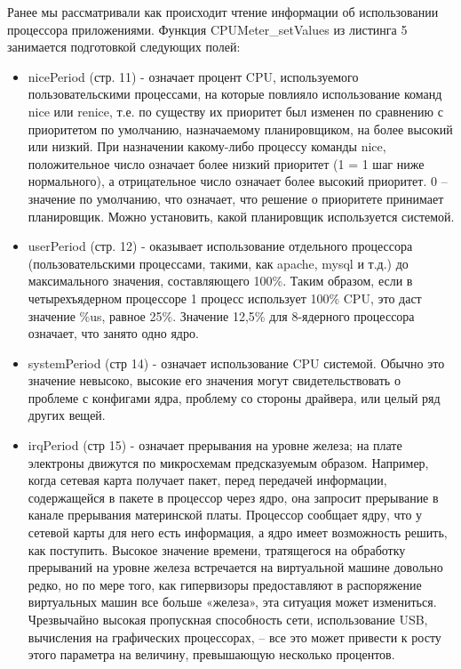 \documentclass[a4paper, 12pt]{article}		%
\begin{document}
Ранее мы рассматривали как происходит чтение информации об использовании процессора приложениями. Функция CPUMeter\_setValues из листинга 5 занимается подготовкой следующих полей:
\begin{itemize}
\item nicePeriod (стр. 11) - означает процент CPU, используемого пользовательскими процессами, на которые повлияло использование команд nice или renice, т.е. по существу их приоритет был изменен по сравнению с приоритетом по умолчанию, назначаемому планировщиком, на более высокий или низкий. При назначении какому-либо процессу команды nice, положительное число означает более низкий приоритет (1 = 1 шаг ниже нормального), а отрицательное число означает более высокий приоритет. 0 -- значение по умолчанию, что означает, что решение о приоритете принимает планировщик. Можно установить, какой планировщик используется системой.
\item userPeriod (стр. 12) - оказывает использование отдельного процессора (пользовательскими процессами, такими, как apache, mysql и т.д.) до максимального значения, составляющего 100\%. Таким образом, если в четырехъядерном процессоре 1 процесс использует 100\% CPU, это даст значение \%us, равное 25\%. Значение 12,5\% для 8-ядерного процессора означает, что занято одно ядро.
\item systemPeriod (стр 14) - означает использование CPU системой. Обычно это значение невысоко, высокие его значения могут свидетельствовать о проблеме с конфигами ядра, проблему со стороны драйвера, или целый ряд других вещей.
\item irqPeriod (стр 15) - означает прерывания на уровне железа; на плате электроны движутся по микросхемам предсказуемым образом. Например, когда сетевая карта получает пакет, перед передачей информации, содержащейся в пакете в процессор через ядро, она запросит прерывание в канале прерывания материнской платы. Процессор сообщает ядру, что у сетевой карты для него есть информация, а ядро имеет возможность решить, как поступить. Высокое значение времени, тратящегося на обработку прерываний на уровне железа встречается на виртуальной машине довольно редко, но по мере того, как гипервизоры предоставляют в распоряжение виртуальных машин все больше «железа», эта ситуация может измениться. Чрезвычайно высокая пропускная способность сети, использование USB, вычисления на графических процессорах, -- все это может привести к росту этого параметра на величину, превышающую несколько процентов.

\end{itemize}
\end{document}
